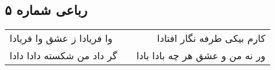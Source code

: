 \begin{center}
\section*{رباعی شماره ۵}
\label{sec:sh005}
\begin{longtable}{l p{0.5cm} r}
وا فریادا ز عشق وا فریادا
&&
کارم بیکی طرفه نگار افتادا
\\
گر داد من شکسته دادا دادا
&&
ور نه من و عشق هر چه بادا بادا
\\
\end{longtable}
\end{center}
